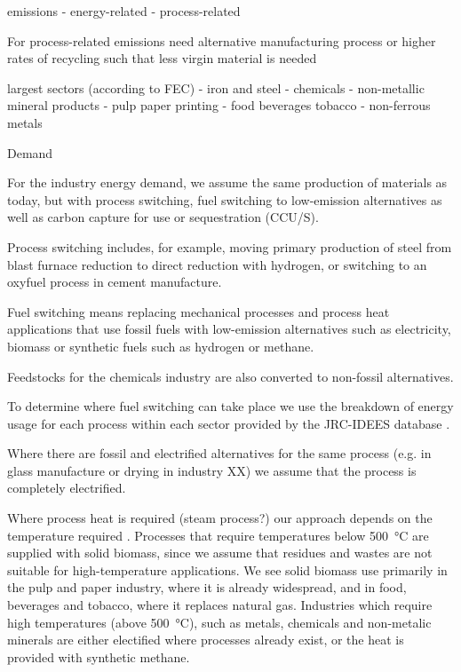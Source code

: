 emissions
- energy-related
- process-related

For process-related emissions need alternative manufacturing process
or higher rates of recycling such that less virgin material is needed

largest sectors (according to FEC)
- iron and steel
- chemicals
- non-metallic mineral products
- pulp paper printing
- food beverages tobacco
- non-ferrous metals

Demand

For the industry energy demand, we assume the same
production of materials as today, but with process switching, fuel switching to
low-emission alternatives as well as carbon capture for use or sequestration
(CCU/S).

Process switching includes, for example, moving primary production of
steel from blast furnace reduction to direct reduction with hydrogen, or
switching to an oxyfuel process in cement manufacture.

Fuel switching means
replacing mechanical processes and process heat applications that use fossil
fuels with low-emission alternatives such as electricity, biomass or synthetic
fuels such as hydrogen or methane.

Feedstocks for the chemicals industry are
also converted to non-fossil alternatives.

To determine where fuel switching can take place we use the breakdown of energy
usage for each process within each sector provided by the JRC-IDEES database
.

Where there are fossil and electrified alternatives for the same
process (e.g. in glass manufacture or drying in industry XX) we assume that the
process is completely electrified.

Where process heat is required (steam
process?) our approach depends on the temperature required
. Processes that require temperatures below
\SI{500}{\celsius} are supplied with solid biomass, since we assume that residues and
wastes are not suitable for high-temperature applications. We see solid biomass
use primarily in the pulp and paper industry, where it is already widespread,
and in food, beverages and tobacco, where it replaces natural gas. Industries
which require high temperatures (above \SI{500}{\celsius}), such as metals, chemicals
and non-metalic minerals are either electified where processes already exist, or
the heat is provided with synthetic methane.

